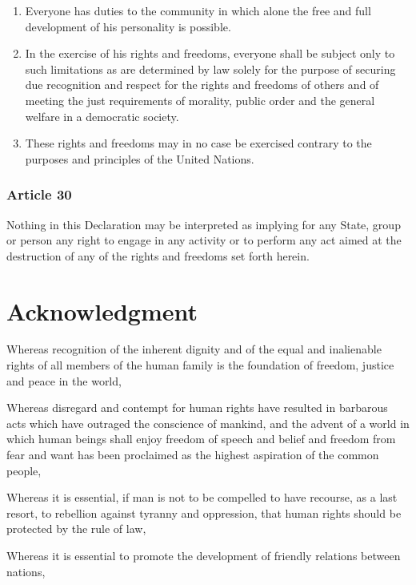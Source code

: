 \documentclass[
  ngerman,
  american,
  titlepage,
  openright,
  DIV=calc,
  toc=listof,
  listof=nochaptergap]{scrbook}
\begin{document}
\begin{enumerate}
\def\labelenumi{\arabic{enumi}.}
\item
  Everyone has duties to the community in which alone the free and full
  development of his personality is possible.
\item
  In the exercise of his rights and freedoms, everyone shall be subject
  only to such limitations as are determined by law solely for the
  purpose of securing due recognition and respect for the rights and
  freedoms of others and of meeting the just requirements of morality,
  public order and the general welfare in a democratic society.
\item
  These rights and freedoms may in no case be exercised contrary to the
  purposes and principles of the United Nations.
\end{enumerate}

\subsection{Article 30}\label{article-30-4}

Nothing in this Declaration may be interpreted as implying for any
State, group or person any right to engage in any activity or to perform
any act aimed at the destruction of any of the rights and freedoms set
forth herein.

\chapter{Acknowledgment}\label{sec-acknowledgment}

Whereas recognition of the inherent dignity and of the equal and
inalienable rights of all members of the human family is the foundation
of freedom, justice and peace in the world,

Whereas disregard and contempt for human rights have resulted in
barbarous acts which have outraged the conscience of mankind, and the
advent of a world in which human beings shall enjoy freedom of speech
and belief and freedom from fear and want has been proclaimed as the
highest aspiration of the common people,

Whereas it is essential, if man is not to be compelled to have recourse,
as a last resort, to rebellion against tyranny and oppression, that
human rights should be protected by the rule of law,

Whereas it is essential to promote the development of friendly relations
between nations,
\end{document}
